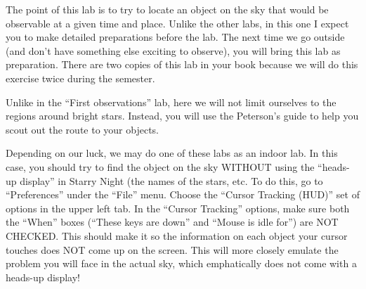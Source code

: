 
\noindent The point of this lab is to try to locate an object on the
sky that would be observable at a given time and place. Unlike the
other labs, in this one I expect you to make detailed preparations
before the lab. The next time we go outside (and don't have something
else exciting to observe), you will bring this lab as
preparation. There are two copies of this lab in your book because we
will do this exercise twice during the semester.

\noindent Unlike in the ``First observations'' lab, here we will not
limit ourselves to the regions around bright stars.  Instead, you will
use the Peterson's guide to help you scout out the route to your
objects.  

\noindent Depending on our luck, we may do one of these labs as an
indoor lab. In this case, you should try to find the object on the sky
WITHOUT using the ``heads-up display'' in Starry Night (the names of
the stars, etc.  To do this, go to ``Preferences'' under the ``File''
menu.  Choose the ``Cursor Tracking (HUD)'' set of options in the
upper left tab.  In the ``Cursor Tracking'' options, make sure both
the ``When'' boxes (``These keys are down'' and ``Mouse is idle for'')
are NOT CHECKED. This should make it so the information on each object
your cursor touches does NOT come up on the screen.  This will more
closely emulate the problem you will face in the actual sky, which
emphatically does not come with a heads-up display!

